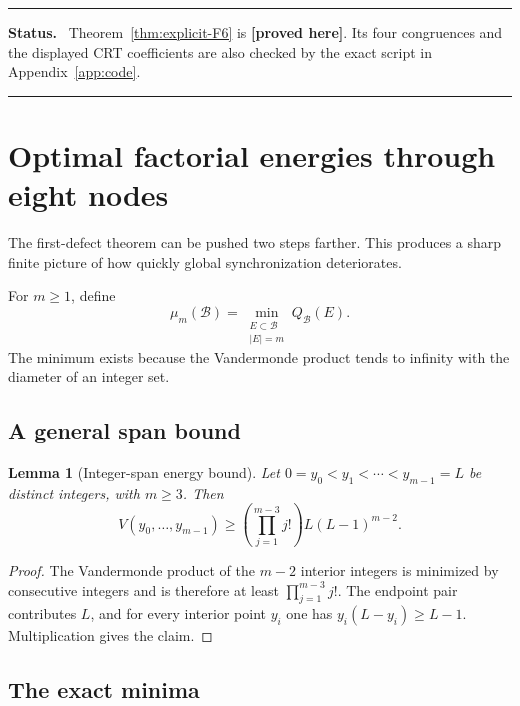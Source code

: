 \documentclass[11pt,oneside]{article}
\newtheorem{lemma}[theorem]{Lemma}
\theoremstyle{definition}
\theoremstyle{remark}
\newcommand{\B}{\mathcal B}
\newcommand{\statusproved}{\textcolor{newgreen}{\textbf{[proved here]}}}
\newenvironment{statusbox}
{\begin{center}\begin{minipage}{0.94\textwidth}\raggedright\hrule
\vspace{0.42em}\textbf{Status.}\ }
{\par\vspace{0.32em}\hrule\end{minipage}\end{center}}
\begin{document}
\begin{statusbox}
Theorem~\ref{thm:explicit-F6} is \statusproved.  Its four congruences and the displayed CRT
coefficients are also checked by the exact script in Appendix~\ref{app:code}.
\end{statusbox}

\section{Optimal factorial energies through eight nodes}
\label{sec:energies-eight}

The first-defect theorem can be pushed two steps farther.  This produces a sharp finite
picture of how quickly global synchronization deteriorates.

For \(m\ge1\), define
\begin{equation}
 \mu_m(\B)=
 \min_{\substack{E\subset\B\\|E|=m}}Q_{\B}(E).
 \label{eq:mu-m}
\end{equation}
The minimum exists because the Vandermonde product tends to infinity with the diameter of an
integer set.

\subsection{A general span bound}

\begin{lemma}[Integer-span energy bound]
\label{lem:span-general}
Let \(0=y_0<y_1<\cdots<y_{m-1}=L\) be distinct integers, with \(m\ge3\).  Then
\begin{equation}
 V(y_0,\ldots,y_{m-1})
 \ge
 \left(\prod_{j=1}^{m-3}j!\right)L(L-1)^{m-2}.
 \label{eq:span-general}
\end{equation}
\end{lemma}

\begin{proof}
The Vandermonde product of the \(m-2\) interior integers is minimized by consecutive integers
and is therefore at least \(\prod_{j=1}^{m-3}j!\).  The endpoint pair contributes \(L\), and
for every interior point \(y_i\) one has \(y_i(L-y_i)\ge L-1\).  Multiplication gives the
claim.
\end{proof}

\subsection{The exact minima}
\end{document}
